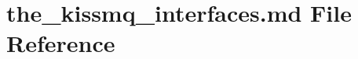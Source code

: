 \hypertarget{the__kissmq__interfaces_8md}{\section{the\-\_\-kissmq\-\_\-interfaces.\-md File Reference}
\label{the__kissmq__interfaces_8md}
}
